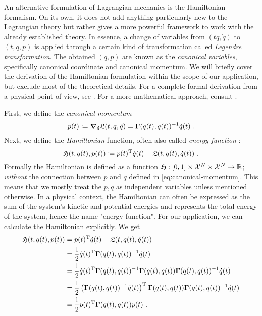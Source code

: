 An alternative formulation of Lagrangian mechanics is the Hamiltonian formalism.
On its own, it does not add anything particularly new to the Lagrangian theory but rather gives a more powerful framework to work with the already established theory.
In essence, a change of variables from $(tq, \dot{q})$ to $(t,q, p)$ is applied through a certain kind of transformation called \emph{Legendre transformation}.
The obtained $(q, p)$ are known as the \emph{canonical variables}, specifically canonical coordinate and canonical momentum.
We will briefly cover the derivation of the Hamiltonian formulation within the scope of our application, but exclude most of the theoretical details.
For a complete formal derivation from a physical point of view, see \cite[Chapter~8]{goldstein01}.
For a more mathematical approach, consult \cite[Chapter~2]{marsden10}.

First, we define the \emph{canonical momentum}
\begin{equation}
\label{eq:canonical-momentum}
	p(t) \coloneqq \grad_{\dot{q}} \mathfrak{L}(t, q, \dot{q}) = \mathbf{\Gamma}(q(t), q(t))^{-1} \dot{q}(t) \ .
\end{equation}
Next, we define the \emph{Hamiltonian} function, often also called \emph{energy function} \cite{marsden10}:
\begin{equation}
	\mathfrak{H}(t, q(t), p(t)) \coloneqq p(t)^\mathrm{T}\dot{q}(t) - \mathfrak{L}(t, q(t), \dot{q}(t)) \ .
\end{equation}
Formally the Hamiltonian is defined as a function $\mathfrak{H}: [0,1] \times \mathcal{X}^N \times \mathcal{X}^N \rightarrow \mathbb{R}$; \emph{without} the connection between $p$ and $q$ defined in \cref{eq:canonical-momentum}.
This means that we mostly treat the $p, q$ as independent variables unless mentioned otherwise.
In a physical context, the Hamiltonian can often be expressed as the sum of the system's kinetic and potential energies and represents the total energy of the system, hence the name "energy function".
For our application, we can calculate the Hamiltonian explicitly.
We get
\begin{align}
	\mathfrak{H}(t, q(t), p(t)) &=p(t)^\mathrm{T}\dot{q}(t) - \mathfrak{L}(t, q(t), \dot{q}(t))\\
	&= \frac{1}{2} \dot{q}(t)^{\mathrm{T}} \mathbf{\Gamma}(q(t), q(t))^{-1} \dot{q}(t) \\
	&= \frac{1}{2} \dot{q}(t)^{\mathrm{T}} \mathbf{\Gamma}(q(t), q(t))^{-1} \mathbf{\Gamma}(q(t), q(t)) \mathbf{\Gamma}(q(t), q(t))^{-1} \dot{q}(t)\\
	&= \frac{1}{2}  \left(\mathbf{\Gamma}(q(t), q(t))^{-1} \dot{q}(t)\right)^{\mathrm{T}} \mathbf{\Gamma}(q(t), q(t)) \mathbf{\Gamma}(q(t), q(t))^{-1} \dot{q}(t)\\
	&= \frac{1}{2} p(t)^{\mathrm{T}} \mathbf{\Gamma}(q(t), q(t)) p(t) \ .
\end{align}

